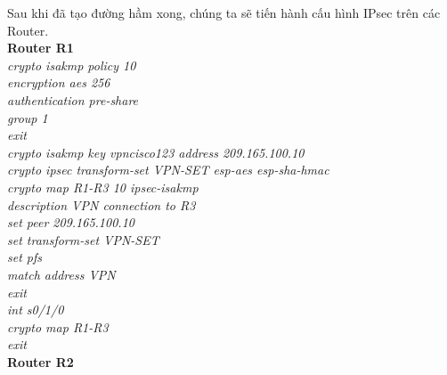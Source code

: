 \documentclass[a4paper, 12pt]{article}
\begin{document}
\hspace*{1cm}Sau khi đã tạo đường hầm xong, chúng ta sẽ tiến hành cấu hình IPsec trên các Router.\\
\hspace*{1cm}\textbf{Router R1}	\\
\hspace*{2cm}\textit{crypto isakmp policy 10\\
\hspace*{2cm}encryption aes 256\\
\hspace*{2cm}authentication pre-share\\
\hspace*{2cm}group 1\\
\hspace*{2cm}exit\\
\hspace*{2cm}crypto isakmp key vpncisco123 address 209.165.100.10\\
\hspace*{2cm}crypto ipsec transform-set VPN-SET esp-aes esp-sha-hmac\\
\hspace*{2cm}crypto map R1-R3 10 ipsec-isakmp\\
\hspace*{2cm}description VPN connection to R3\\
\hspace*{2cm}set peer 209.165.100.10\\
\hspace*{2cm}set transform-set VPN-SET\\
\hspace*{2cm}set pfs\\
\hspace*{2cm}match address VPN\\
\hspace*{2cm}exit \\
\hspace*{2cm}int s0/1/0\\
\hspace*{2cm}crypto map R1-R3\\
\hspace*{2cm}exit\\}
\hspace*{1cm}\textbf{Router R2}	\\
\end{document}
